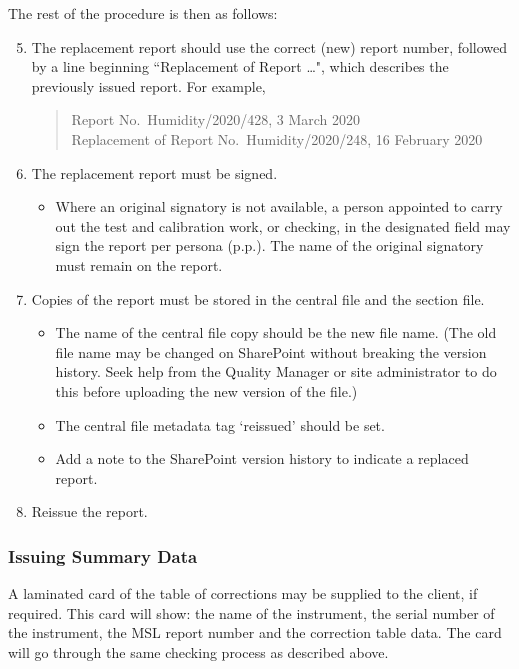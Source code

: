 The rest of the procedure is then as follows: 
\begin{enumerate}
\setcounter{enumi}{4}
\item The replacement report should use the correct (new) report number, followed by a line beginning ``Replacement of Report \ldots", which describes the previously issued report. For example, 
\begin{quote}
Report No.\ Humidity/2020/428, 3 March 2020\\
 Replacement of Report No.\ Humidity/2020/248, 16 February 2020
\end{quote}

\item The replacement report must be signed.
\begin{itemize}
\item Where an original signatory is not available, a person appointed to carry out the test and calibration work, or checking, in the designated field may sign the report per persona (p.p.).  The name of the original signatory must remain on the report.
\end{itemize}

\item Copies of the report must be stored in the central file and the section file.
\begin{itemize}
\item The name of the central file copy should be the new file name. (The old file name may be changed on SharePoint without breaking the version history. Seek help from the Quality Manager or site administrator to do this before uploading the new version of the file.) 
\item The central file metadata tag `reissued' should be set.
\item Add a note to the SharePoint version history to indicate a replaced report.
\end{itemize}
\item Reissue the report.

\end{enumerate}

\subsubsection{Issuing Summary Data}
A laminated card of the table of corrections may be supplied to the client, if required. This card will show: the name of the instrument, the serial number of the instrument, the MSL report number and the correction table data. The card will go through the same checking process as described above.

